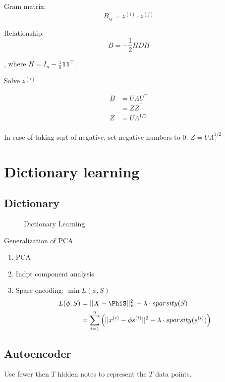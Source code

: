 \documentclass[a4paper]{report}
\begin{document}
Gram matrix:
$$
B_{ij} = z^{(i)}\cdot z^{(j)}
$$

Relationship:
$$
B = -\frac{1}{2} HDH
$$

, where $H=I_n - \frac{1}{n}\boldsymbol1\boldsymbol1^\top$.

Solve $z^{(i)}$

\begin{align*}
B &= U\Lambda U^\top \\
&= ZZ^\top \\
Z &= U\Lambda^{1/2} \\
\end{align*}

In case of taking sqrt of negative, set negative numbers to 0. $Z=U\Lambda_+^{1/2}$
\section{Dictionary learning}
\subsection{Dictionary}
\begin{figure}[!htp]
\centering
{}
\caption{Dictionary Learning}
\label{fig:dicLearn}
\end{figure}

Generalization of PCA
\begin{enumerate}
\item PCA
\item Indpt component analysis
\item Spare encoding: $\min L(\phi, S) $
\begin{align*}
L(\phi, S) &= ||X-\PhiS||_F^2 - \lambda\cdot sparsity(S) \\
&= \sum_{i=1}^n \Big(||x^{(i)}-\phi s^{(i)}||^2-\lambda\cdot sparsity(s^{(i)})\Big)
\end{align*}
\end{enumerate}

\subsection{Autoencoder}
Use fewer then $T$ hidden notes to represent the $T$ data points. 
\end{document}
